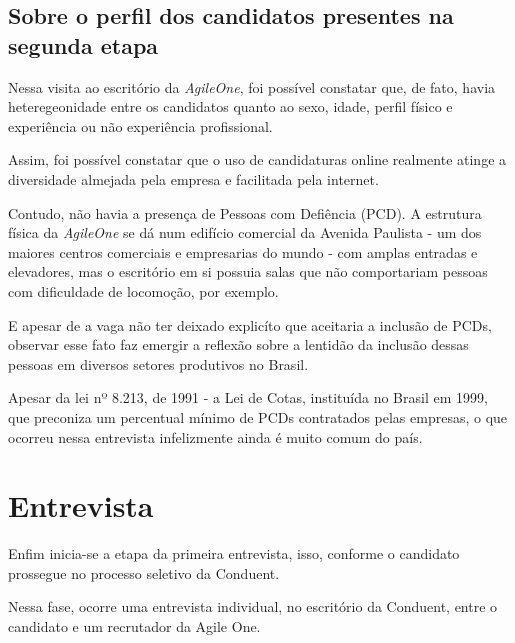 \documentclass[12pt]{article}
\begin{document}

\subsection {Sobre o perfil dos candidatos presentes na segunda etapa}

Nessa visita ao escritório da \textit{AgileOne}, foi possível constatar que, de fato, havia heteregeonidade entre os candidatos quanto ao sexo, idade, perfil físico e experiência ou não experiência profissional. 

Assim, foi possível constatar que o uso de candidaturas online realmente atinge a diversidade almejada pela empresa e facilitada pela internet. 

Contudo, não havia a presença de Pessoas com Defiência (PCD). A estrutura física da \emph {AgileOne} se dá num edifício comercial da Avenida Paulista - um dos maiores centros comerciais e empresarias do mundo  - com amplas entradas e elevadores, mas o escritório em si possuia salas que não comportariam pessoas com dificuldade de locomoção, por exemplo. 

E apesar de a vaga não ter deixado explicíto que aceitaria a inclusão de PCDs, observar esse fato faz emergir a reflexão sobre a lentidão da  inclusão dessas pessoas em diversos setores produtivos no  Brasil.

Apesar da  lei nº 8.213, de 1991 -  a Lei de Cotas, instituída no Brasil em 1999, que preconiza  um percentual mínimo de PCDs contratados pelas empresas,  o que ocorreu nessa entrevista infelizmente ainda é muito comum do país.



\section{Entrevista}
Enfim inicia-se a etapa da primeira entrevista, isso, conforme o candidato prossegue no processo seletivo da Conduent. 

Nessa fase, ocorre uma entrevista individual, no escritório da Conduent, entre o candidato e um recrutador da Agile One.
\end{document}
